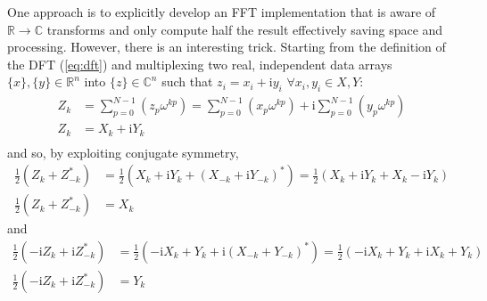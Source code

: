 \documentclass{article}
\begin{document}
One approach is to explicitly develop an FFT implementation that is aware of $\mathbb{R} \rightarrow \mathbb{C}$ transforms and only compute half the result effectively saving space and processing.
However, there is an interesting trick.
Starting from the definition of the DFT (\ref{eq:dft}) and multiplexing two real, independent data arrays $\{x\},\{y\} \in \mathbb{R}^n$ into $\{z\} \in \mathbb{C}^n$ such that $z_i = x_i + \mathrm {i} y_i$ $\forall x_i,y_i \in X,Y$:
%
\begin {equation}
\begin {aligned}
Z_k &= \sum_{p = 0}^{N-1} (z_p \omega^{k p}) = \sum_{p = 0}^{N-1} (x_p \omega^{k p}) + \mathrm{i} \sum_{p = 0}^{N-1} (y_p \omega^{k p}) \\
Z_k &= X_k + \mathrm{i} Y_k \\
\end {aligned}
\end {equation}
%
and so, by exploiting conjugate symmetry,
%
\begin {equation}
\begin {aligned}
\frac{1}{2} (Z_k + Z_{-k}^*) &= \frac{1}{2} (X_k + \mathrm{i} Y_k + (X_{-k} + \mathrm{i} Y_{-k})^*) = \frac{1}{2} (X_k + \mathrm{i} Y_k + X_k - \mathrm{i} Y_k) \\
\frac{1}{2} (Z_k + Z_{-k}^*) &= X_k
\end {aligned}
\end {equation}
%
and
%
\begin {equation}
\begin {aligned}
\frac{1}{2} (-\mathrm{i} Z_k + \mathrm{i} Z_{-k}^*) &= \frac{1}{2} (-\mathrm{i} X_k + Y_k + \mathrm{i} (X_{-k} + Y_{-k})^*) = \frac{1}{2} (-\mathrm{i} X_k + Y_k + \mathrm{i} X_k + Y_k) \\
\frac{1}{2} (-\mathrm{i} Z_k + \mathrm{i} Z_{-k}^*) &= Y_k
\end {aligned}
\end {equation}
%
\end{document}
